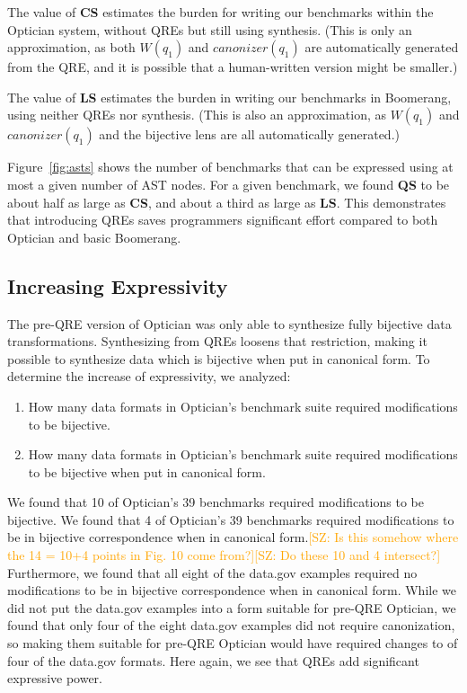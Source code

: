 \documentclass[acmsmall,review,anonymous]{acmart}
\newcommand{\FINISH}[3]{\ifdraft\textcolor{#1}{[#2: #3]}\fi}
\newcommand{\saz}[1]{\FINISH{orange}{SZ}{#1}}
\newcommand{\kw}[1]{\ensuremath{\mathit{#1}}}
\newcommand{\canonizer}{\ensuremath{\kw{canonizer}}}
\newcommand{\QRESize}{\textbf{QS}}
\newcommand{\CanonizerAndSpecSize}{\textbf{CS}}
\newcommand{\LensAndSpecSize}{\textbf{LS}}
\begin{document}
The value of \CanonizerAndSpecSize{} estimates the burden for writing our
benchmarks within the Optician system, without QREs but still using
synthesis. (This is only an approximation, as both $W(q_1)$ and $\canonizer(q_1)$ are
automatically generated from the QRE, and it is possible that a human-written
version might be smaller.)

The value of \LensAndSpecSize{} estimates the burden in writing our benchmarks
in Boomerang, using neither QREs nor synthesis. (This is also an
approximation, as $W(q_1)$ and $\canonizer(q_1)$ and the bijective lens are all
automatically generated.)

Figure~\ref{fig:asts} shows the number of benchmarks that can be expressed using
at most a given number of AST nodes. For a given benchmark, we found \QRESize{}
to be about half as large as \CanonizerAndSpecSize, and about a third as large
as \LensAndSpecSize{}. This demonstrates that introducing QREs saves programmers
significant effort compared to both Optician and basic Boomerang.

\subsection{Increasing Expressivity}

The pre-QRE version of Optician was only able to synthesize fully bijective data
transformations.  Synthesizing from QREs loosens that restriction, making it
possible to synthesize data which is bijective when put in canonical form. To
determine the increase of expressivity, we analyzed:
\begin{enumerate}
  \item How many data formats in Optician's benchmark suite required modifications
  to be bijective.
  \item How many data formats in Optician's benchmark suite required modifications
  to be bijective when put in canonical form.
\end{enumerate}

We found that 10 of Optician's 39 benchmarks required modifications to be
bijective. We found that 4 of Optician's 39 benchmarks required modifications to
be in bijective correspondence when in canonical form.\saz{Is this somehow where
  the 14 = 10+4 points in Fig. 10 come from?}\saz{Do these 10 and 4 intersect?}
Furthermore, we found that all eight of the data.gov examples required no
modifications to be in bijective correspondence when in canonical form. While we
did not put the data.gov examples into a form suitable for pre-QRE Optician, we
found that only four of the eight data.gov examples did not require
canonization, so making them suitable for pre-QRE Optician would have required 
changes to of four of the data.gov formats.  Here again, we see that QREs add
significant expressive power.
\end{document}
